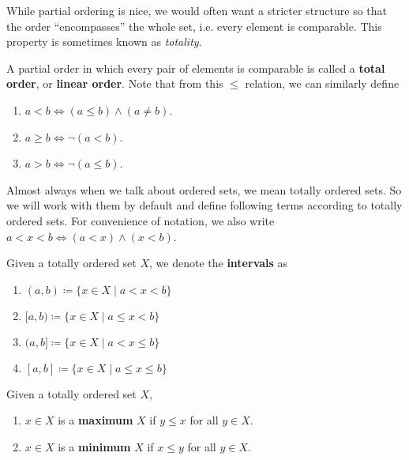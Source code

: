   While partial ordering is nice, we would often want a stricter structure so that the order ``encompasses'' the whole set, i.e. every element is comparable. This property is sometimes known as \textit{totality}. 

  \begin{definition}
    A partial order in which every pair of elements is comparable is called a \textbf{total order}, or \textbf{linear order}. Note that from this $\leq$ relation, we can similarly define 
    \begin{enumerate}
      \item $a < b \iff (a \leq b) \land (a \neq b)$. 
      \item $a \geq b \iff \neg(a < b)$. 
      \item $a > b \iff \neg(a \leq b)$. 
    \end{enumerate} 
  \end{definition}

  Almost always when we talk about ordered sets, we mean totally ordered sets. So we will work with them by default and define following terms according to totally ordered sets. For convenience of notation, we also write $a < x < b \iff (a < x) \land (x < b)$. 

  \begin{definition}[Interval]
    Given a totally ordered set $X$, we denote the \textbf{intervals} as 
    \begin{enumerate}
      \item $(a, b) \coloneqq \{x \in X \mid a < x < b \}$
      \item $[a, b) \coloneqq \{x \in X \mid a \leq x < b \}$
      \item $(a, b] \coloneqq \{x \in X \mid a < x \leq b \}$
      \item $[a, b] \coloneqq \{x \in X \mid a \leq x \leq b \}$
    \end{enumerate}
  \end{definition} 

  \begin{definition}[Extrema]
    Given a totally ordered set $X$, 
    \begin{enumerate}
      \item $x \in X$ is a \textbf{maximum} $X$ if $y \leq x$ for all $y \in X$. 
      \item $x \in X$ is a \textbf{minimum} $X$ if $x \leq y$ for all $y \in X$. 
    \end{enumerate}
  \end{definition}

